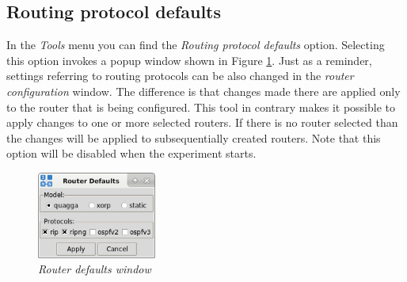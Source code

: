 \subsection{Routing protocol defaults}
\label{sec:RoutingProtocolDefaults}
In the \emph{Tools} menu you can find the \emph{Routing protocol defaults}
option. Selecting this option invokes a popup window shown in Figure
\ref{fig:router_def_1}. Just as a reminder, settings referring to routing
protocols can be also changed in the \emph{router configuration} window. The
difference is that changes made there are applied only to the router that is
being configured. This tool in contrary makes it possible to apply changes to
one or more selected routers. If there is no router selected than the changes
will be applied to subsequentially created routers. Note that this option will
be disabled when the experiment starts.

\begin{figure}[H]
\centering
\vspace{10pt}
\includegraphics[width=0.35\textwidth]{./images/router_defaults_1.png}
\caption{\emph{Router defaults window}}
\label{fig:router_def_1}
\end{figure}
